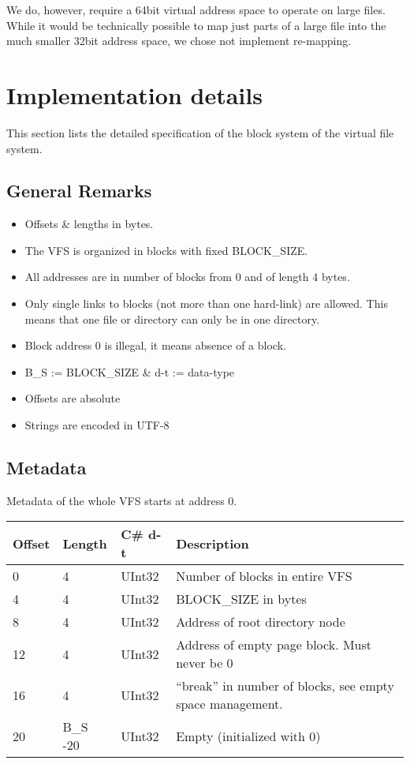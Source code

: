 \documentclass[a4paper,12pt]{article}
\begin{document}
\begin{enumerate}
We do, however, require a 64bit virtual address space to operate on large files. 
While it would be technically possible to map just parts of a large file into the much smaller 32bit address space, we chose not implement re-mapping.
\end{enumerate}

\section{Implementation details}\label{sct:impl}

This section lists the detailed specification of the block system of the virtual file system.

\subsection{General Remarks}

\begin{itemize}
	\item Offsets \& lengths in bytes.
	\item The VFS is organized in blocks with fixed BLOCK\_SIZE.
	\item All addresses are in number of blocks from 0 and of length 4 bytes.
	\item Only single links to blocks (not more than one hard-link) are allowed. This means that one file or directory can only be in one directory.
	\item Block address 0 is illegal, it means absence of a block.
	\item B\_S := BLOCK\_SIZE \& d-t := data-type
	\item Offsets are absolute
	\item Strings are encoded in UTF-8
\end{itemize}

\subsection{Metadata}

Metadata of the whole VFS starts at address 0.\\

\begin{tabular}{|p{1.5cm}|p{1.5cm}|p{1.5cm}|p{7cm}|}\hline
Offset 	&Length	&C\# d-t	&Description\\\hline
0	&4	&UInt32	&Number of blocks in entire VFS\\
4	&4	&UInt32	&BLOCK\_SIZE in bytes\\
8	&4	&UInt32	&Address of root directory node\\
12	&4	&UInt32	&Address of empty page block. Must never be 0\\
16	&4	&UInt32	&“break” in number of blocks, see empty space management.\\
20	&B\_S -20	&UInt32	&Empty (initialized with 0)\\\hline
\end{tabular}\\
\end{document}
